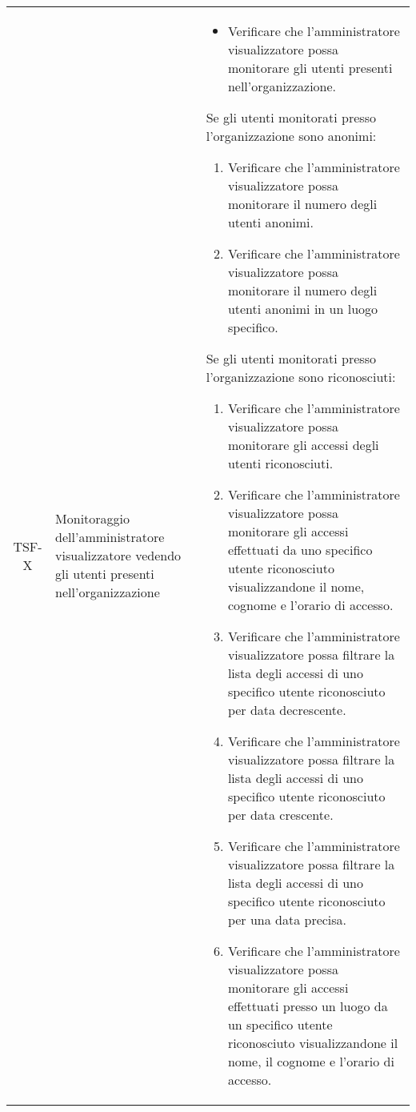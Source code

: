 {\begin{longtable}{ c | C{3cm} | C{11cm} }
TSF-X & Monitoraggio dell'amministratore visualizzatore vedendo gli utenti presenti nell'organizzazione & \begin{itemize}
    \item Verificare che l'amministratore visualizzatore possa monitorare gli utenti presenti nell'organizzazione.
\end{itemize}
Se gli utenti monitorati presso l'organizzazione sono anonimi:
\begin{enumerate}
    \item Verificare che l'amministratore visualizzatore possa monitorare il numero degli utenti anonimi.
    \item Verificare che l'amministratore visualizzatore possa monitorare il numero degli utenti anonimi in un luogo specifico.
\end{enumerate}
Se gli utenti monitorati presso l'organizzazione sono riconosciuti:
\begin{enumerate}
    \item Verificare che l'amministratore visualizzatore possa monitorare gli accessi degli utenti riconosciuti.
    \item Verificare che l'amministratore visualizzatore possa monitorare gli accessi effettuati da uno specifico utente riconosciuto visualizzandone il nome, cognome e l'orario di accesso.
    \item Verificare che l'amministratore visualizzatore possa filtrare la lista degli accessi di uno specifico utente riconosciuto per data decrescente.
    \item Verificare che l'amministratore visualizzatore possa filtrare la lista degli accessi di uno specifico utente riconosciuto per data crescente.
    \item Verificare che l'amministratore visualizzatore possa filtrare la lista degli accessi di uno specifico utente riconosciuto per una data precisa.
    \item Verificare che l'amministratore visualizzatore possa monitorare gli accessi effettuati presso un luogo da un specifico utente riconosciuto visualizzandone il nome, il cognome e l’orario di accesso.
\end{enumerate} \\




\end{longtable}}
